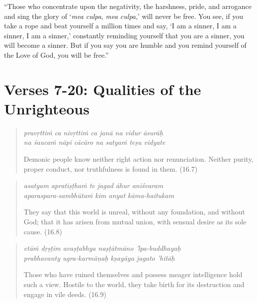 \documentclass[12pt, twoside, openright]{memoir}
\begin{document}
\enquote{Those who concentrate upon the negativity, the harshness, pride, and arrogance and sing the glory of \enquote{\textit{mea culpa}, \textit{mea culpa},} will never be free. You see, if you take a rope and beat yourself a million times and say, \enquote{I am a sinner, I am a sinner, I am a sinner,} constantly reminding yourself that you are a sinner, you will become a sinner. But if you say you are humble and you remind yourself of the Love of God, you will be free.}

\section{Verses 7-20: Qualities of the Unrighteous}\label{sec-verses-7-20-qualities-of-the-unrighteous}

\par
\begin{verse}
\textit{pravṛttiṁ ca nivṛttiṁ ca janā na vidur āsurāḥ} \\
\textit{na śaucaṁ nāpi cācāro na satyaṁ teṣu vidyate}

\noindent Demonic people know neither right action nor renunciation. Neither purity, proper conduct, nor truthfulness is found in them. (16.7)
\end{verse}
\par



\par
\begin{verse}
\textit{asatyam apratiṣṭhaṁ te jagad āhur anīśvaram} \\
\textit{aparaspara-sambhūtaṁ kim anyat kāma-haitukam}

\noindent They say that this world is unreal, without any foundation, and without God; that it has arisen from mutual union, with sensual desire as its sole cause. (16.8)
\end{verse}
\par



\par
\begin{verse}
\textit{etāṁ dṛṣṭim avaṣṭabhya naṣṭātmāno ’lpa-buddhayaḥ} \\
\textit{prabhavanty ugra-karmāṇaḥ kṣayāya jagato ’hitāḥ}

\noindent Those who have ruined themselves and possess meager intelligence hold such a view. Hostile to the world, they take birth for its destruction and engage in vile deeds. (16.9)
\end{verse}
\par
\end{document}
